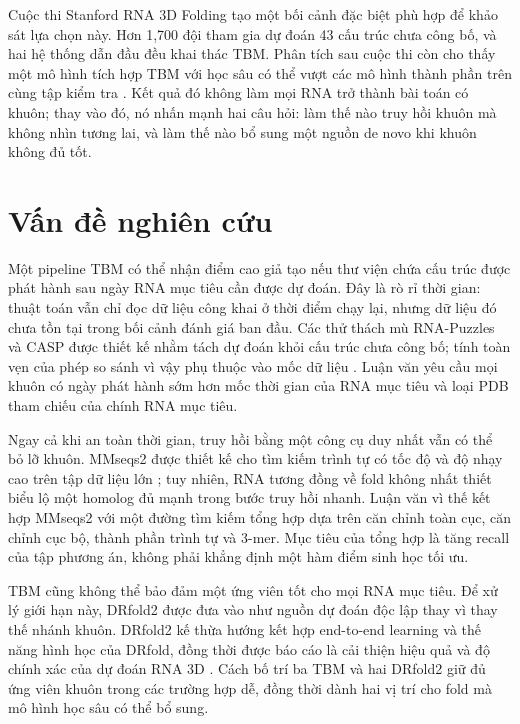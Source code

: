 \documentclass[12pt,a4paper,oneside]{report}
\begin{document}
Cuộc thi Stanford RNA 3D Folding tạo một bối cảnh đặc biệt phù hợp để khảo sát lựa chọn
này. Hơn 1,700 đội tham gia dự đoán 43 cấu trúc chưa công bố, và hai hệ thống dẫn đầu
đều khai thác TBM. Phân tích sau cuộc thi còn cho thấy một mô hình tích hợp TBM với học
sâu có thể vượt các mô hình thành phần trên cùng tập kiểm tra
\cite{competition_paper}. Kết quả đó không làm mọi RNA trở thành bài toán có khuôn;
thay vào đó, nó nhấn mạnh hai câu hỏi: làm thế nào truy hồi khuôn mà không nhìn tương
lai, và làm thế nào bổ sung một nguồn de novo khi khuôn không đủ tốt.

\section{Vấn đề nghiên cứu}

Một pipeline TBM có thể nhận điểm cao giả tạo nếu thư viện chứa cấu trúc được phát hành
sau ngày RNA mục tiêu cần được dự đoán. Đây là rò rỉ thời gian: thuật toán vẫn chỉ đọc dữ liệu
công khai ở thời điểm chạy lại, nhưng dữ liệu đó chưa tồn tại trong bối cảnh đánh giá
ban đầu. Các thử thách mù RNA-Puzzles và CASP được thiết kế nhằm tách dự đoán khỏi cấu
trúc chưa công bố; tính toàn vẹn của phép so sánh vì vậy phụ thuộc vào mốc dữ liệu
\cite{rna_puzzles,casp15,competition_paper}. Luận văn yêu cầu mọi khuôn có ngày phát
hành sớm hơn mốc thời gian của RNA mục tiêu và loại PDB tham chiếu của chính RNA mục tiêu.

Ngay cả khi an toàn thời gian, truy hồi bằng một công cụ duy nhất vẫn có thể bỏ lỡ
khuôn. MMseqs2 được thiết kế cho tìm kiếm trình tự có tốc độ và độ nhạy cao trên tập
dữ liệu lớn \cite{mmseqs2}; tuy nhiên, RNA tương đồng về fold không nhất thiết biểu lộ
một homolog đủ mạnh trong bước truy hồi nhanh. Luận văn vì thế kết hợp MMseqs2 với một
đường tìm kiếm tổng hợp dựa trên căn chỉnh toàn cục, căn chỉnh cục bộ, thành phần trình
tự và 3-mer. Mục tiêu của tổng hợp là tăng recall của tập phương án, không phải khẳng
định một hàm điểm sinh học tối ưu.

TBM cũng không thể bảo đảm một ứng viên tốt cho mọi RNA mục tiêu. Để xử lý giới hạn này,
DRfold2 được đưa vào như nguồn dự đoán độc lập thay vì thay thế nhánh khuôn. DRfold2 kế
thừa hướng kết hợp end-to-end learning và thế năng hình học của DRfold, đồng thời được
báo cáo là cải thiện hiệu quả và độ chính xác của dự đoán RNA 3D
\cite{drfold,drfold2}. Cách bố trí ba TBM và hai DRfold2 giữ đủ ứng viên khuôn trong các
trường hợp dễ, đồng thời dành hai vị trí cho fold mà mô hình học sâu có thể bổ sung.
\end{document}
